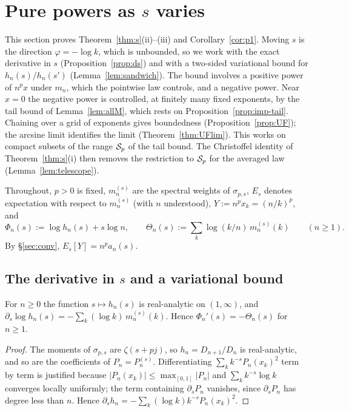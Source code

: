 \section{Pure powers as \texorpdfstring{$s$}{s} varies}\label{sec:s}

This section proves Theorem~\ref{thm:s}(ii)--(iii) and Corollary~\ref{cor:p1}. Moving $s$ is the direction
$\varphi=-\log k$, which is unbounded, so we work with the exact derivative in $s$ (Proposition~\ref{prop:ds}) and with
a two-sided variational bound for $h_n(s)/h_n(s')$ (Lemma~\ref{lem:sandwich}). The bound involves a positive power of
$n^px$ under $m_n$, which the pointwise law controls, and a negative power. Near $x=0$ the negative power is controlled,
at finitely many fixed exponents, by the tail bound of Lemma~\ref{lem:allM}, which rests on
Proposition~\ref{prop:imp-tail}. Chaining over a grid of exponents gives
boundedness (Proposition~\ref{prop:UF}); the arcsine limit identifies the limit (Theorem~\ref{thm:UFlim}). This works
on compact subsets of the range $\mathcal{S}_p$ of the tail bound. The Christoffel identity of Theorem~\ref{thm:s}(i) then
removes the restriction to $\mathcal{S}_p$ for the averaged law (Lemma~\ref{lem:telescope}).

Throughout, $p>0$ is fixed, $m^{(s)}_n$ are the spectral weights of $\sigma_{p,s}$, $E_s$ denotes expectation with
respect to $m^{(s)}_n$ (with $n$ understood), $Y:=n^px_k=(n/k)^p$, and
\[
  \Phi_n(s):=\log h_n(s)+s\log n,\qquad \Theta_n(s):=\sum_k\log(k/n)\,m^{(s)}_n(k)\qquad(n\ge1).
\]
By \S\ref{sec:conv}, $E_s[Y]=n^pa_n(s)$.

\subsection{The derivative in \texorpdfstring{$s$}{s} and a variational bound}

\begin{proposition}\label{prop:ds}
For $n\ge0$ the function $s\mapsto h_n(s)$ is real-analytic on $(1,\infty)$, and
$\partial_s\log h_n(s)=-\sum_k(\log k)\,m^{(s)}_n(k)$. Hence $\Phi_n'(s)=-\Theta_n(s)$ for $n\ge1$.
\end{proposition}

\begin{proof}
The moments of $\sigma_{p,s}$ are $\zeta(s+pj)$, so $h_n=D_{n+1}/D_n$ is real-analytic, and so are the coefficients
of $P_n=P_n^{(s)}$. Differentiating $\sum_kk^{-s}P_n(x_k)^2$ term by term is justified because $|P_n(x_k)|\le
\max_{[0,1]}|P_n|$ and $\sum_kk^{-s}\log k$ converges locally uniformly; the term containing $\partial_sP_n$ vanishes,
since $\partial_sP_n$ has degree less than $n$. Hence $\partial_sh_n=-\sum_k(\log k)k^{-s}P_n(x_k)^2$.
\end{proof}

